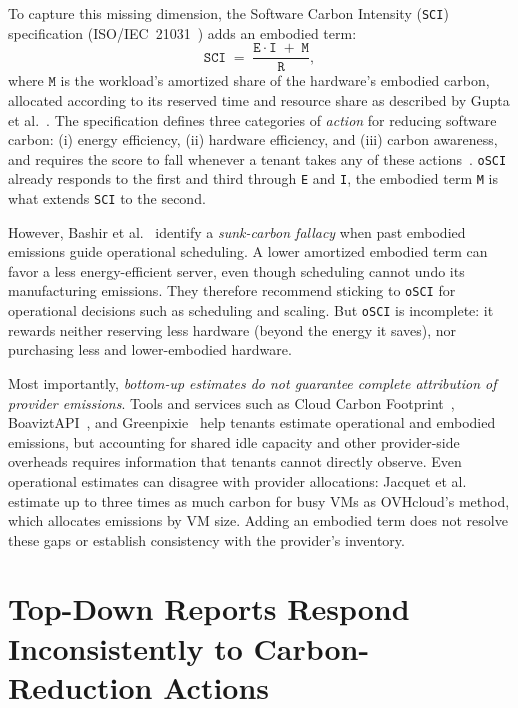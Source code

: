 \documentclass[sigconf]{acmart}
\newcommand{\SCI}{\texttt{SCI}\xspace}
\newcommand{\OSCI}{\texttt{oSCI}\xspace}
\newcommand{\E}{\texttt{E}\xspace}
\newcommand{\I}{\texttt{I}\xspace}
\newcommand{\M}{\texttt{M}\xspace}
\newcommand{\R}{\texttt{R}\xspace}
\begin{document}
To capture this missing dimension, the Software Carbon Intensity (\SCI) specification (ISO/IEC~21031~\cite{sci-spec}) adds an embodied term:
\[
\SCI \;=\; \frac{\E \cdot \I \;+\; \M}{\R},
\]
where $\M$ is the workload's amortized share of the hardware's embodied carbon, allocated according to its reserved time and resource share as described by Gupta et al.~\cite{gupta2022act}.
The specification defines three categories of \emph{action} for reducing software carbon: (i) energy efficiency, (ii) hardware efficiency, and (iii) carbon awareness, and requires the score to fall whenever a tenant takes any of these actions~\cite{sci-spec}.
\OSCI already responds to the first and third through \E and \I, the embodied term \M is what extends \SCI to the second.

However, Bashir et al.~\cite{bashir2024} identify a \emph{sunk-carbon fallacy} when past embodied emissions guide operational scheduling.
A lower amortized embodied term can favor a less energy-efficient server, even though scheduling cannot undo its manufacturing emissions.
They therefore recommend sticking to \OSCI for operational decisions such as scheduling and scaling.
But \OSCI is incomplete: it rewards neither reserving less hardware (beyond the energy it saves), nor purchasing less and lower-embodied hardware.

Most importantly, \emph{bottom-up estimates do not guarantee complete attribution of provider emissions}.
Tools and services such as Cloud Carbon Footprint~\cite{cloudcarbonfootprint}, BoaviztAPI~\cite{simon2024boaviztapi}, and Greenpixie~\cite{greenpixie-cloud-methodology} help tenants estimate operational and embodied emissions, but accounting for shared idle capacity and other provider-side overheads requires information that tenants cannot directly observe.
Even operational estimates can disagree with provider allocations: Jacquet et al.~\cite{jacquet2025cinergy} estimate up to three times as much carbon for busy VMs as OVHcloud's method, which allocates emissions by VM size.
Adding an embodied term does not resolve these gaps or establish consistency with the provider's inventory.

\section{Top-Down Reports Respond Inconsistently to Carbon-Reduction Actions}
\label{sec:sota}
\end{document}
